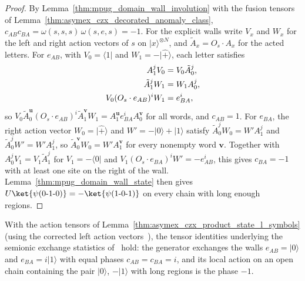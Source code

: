 \begin{proof}
    \leanok
    By Lemma~\ref{thm:mpug_domain_wall_involution} with the fusion tensors
    of Lemma~\ref{thm:asymex_czx_decorated_anomaly_class},
    $c_{AB}c_{BA}=\omega(s,s,s)\,\omega(s,e,s)=-1$. For the explicit walls
    write $V_x$ and $W_x$ for the left and right action vectors of $s$ on
    $|x\rangle^{\otimes N}$, and $\tilde A_x=O_s\cdot A_x$ for the acted
    letters. For $e_{AB}$, with $V_0=\langle1|$ and $W_1=-|\hat+\rangle$, each
    letter satisfies
    \begin{align}
        A_1^jV_0                  & =V_0\tilde A_0^j,
        \notag                                        \\
        \tilde A_1^jW_1           & =W_1A_0^j,
        \notag                                        \\
        V_0(O_s\cdot e_{AB})^iW_1 & =e_{BA}^i,
        \notag
    \end{align}
    so
    $V_0\tilde A_0^{\mathbf u}(O_s\cdot e_{AB})^i\tilde A_1^{\mathbf v}W_1
        =A_1^{\mathbf u}e_{BA}^iA_0^{\mathbf v}$ for all words, and
    $c_{AB}=1$. For $e_{BA}$, the right action vector $W_0=|\hat+\rangle$ and
    $W'=-|0\rangle+|1\rangle$ satisfy $\tilde A_0^jW_0=W'A_1^j$ and
    $\tilde A_0^jW'=W'A_1^j$, so
    $\tilde A_0^{\mathbf v}W_0=W'A_1^{\mathbf v}$ for every nonempty word
    $\mathbf v$. Together with $A_0^jV_1=V_1\tilde A_1^j$ for $V_1=-\langle0|$
    and $V_1(O_s\cdot e_{BA})^iW'=-e_{AB}^i$, this gives $c_{BA}=-1$ with at
    least one site on the right of the wall.
    Lemma~\ref{thm:mpug_domain_wall_state} then gives
    $U\ket{\psi(0\text{-}1\text{-}0)}=-\ket{\psi(1\text{-}0\text{-}1)}$
    on every chain with long enough regions.
\end{proof}

\begin{lemma}
    \label{thm:asymex_czx_semionic_domain_walls}
    \leanok
    With the action tensors of
    Lemma~\ref{thm:asymex_czx_product_state_l_symbols} (using the
    corrected left action vectors~\cite{gap:gs24_czx_action_left_vectors}),
    the tensor identities underlying the semionic exchange statistics
    of~\cite[Section~III.F]{GarreRubioSchuch2024DomainWall} hold: the
    generator exchanges the walls $e_{AB}=|0\rangle$ and
    $e_{BA}=i|1\rangle$ with equal phases $c_{AB}=c_{BA}=i$, and its
    local action on an open chain containing the pair $|0\rangle$,
    $-|1\rangle$ with long regions is the phase $-1$.
\end{lemma}

